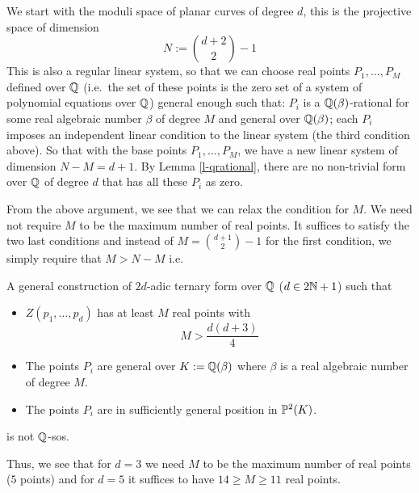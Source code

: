 \begin{none}
We start with the moduli space of planar curves of degree $d$, this is the projective space of dimension 
$$N := \binom{d+2}2 -1 $$
This is also a regular linear system, so that we can choose real points $P_1,\dots, P_M$ defined over $\Q$ (i.e.\ the 
set of these points is the zero set of a system of polynomial equations over $\Q$) general enough such that: 
$P_i$ is a $\Q(\beta)$-rational for some real algebraic number $\beta$ of degree $M$ and general over $\Q(\beta)$;
each $P_i$ imposes an independent linear condition to the linear system (the third condition above). So that with the 
base points $P_1,\dots, P_M$, we have a 
new linear system of dimension $N-M=d+1$. By Lemma \ref{l-qrational}, there are 
no non-trivial form over $\Q$ of degree $d$ that has all these $P_i$ as zero.
\end{none}

From the above argument, we see that we can relax the condition for $M$. We need not require $M$ to be the 
maximum number of real points. It suffices to satisfy the two last 
conditions and instead of $M=\binom{d+1}2-1$ for the first condition, we simply require that $M > N-M$ i.e. 
\begin{prop}
A general construction of $2d$-adic ternary form over $\Q$ ($d\in 2\N+1$) such that 
\begin{itemize}
\item $Z(p_1,\dots, p_d)$ has at least $M$ real points with 
$$ M > \frac{d(d+3)}4$$
\item The points $P_i$ are general over $K:=\Q(\beta)$ where $\beta$ is a real algebraic number of degree $M$.
\item The points $P_i$ are in sufficiently general position in $\P^2(K)$.
\end{itemize}
is not $\Q$-sos.
\end{prop}

\noindent
Thus, we see that for $d=3$ we need $M$ to be the maximum number of real points ($5$ points) and for $d=5$ it 
suffices to have $14\ge M \ge 11$ real points. %
